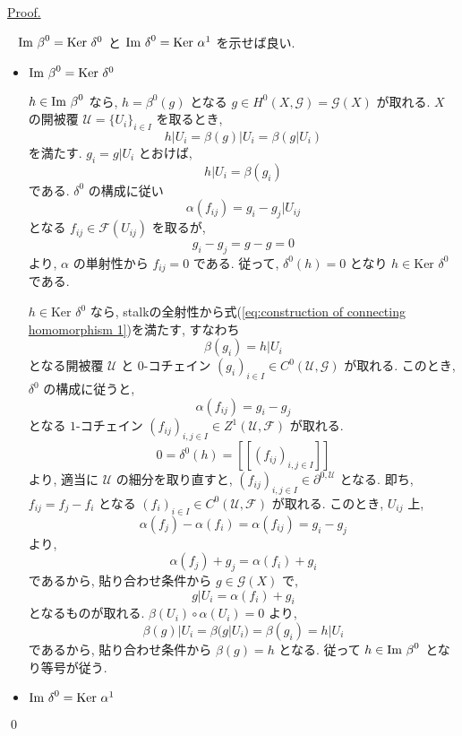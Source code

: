 \documentclass[a4paper,10pt,dvipdfmx]{jsreport}
\renewenvironment{proof}{\begin{flushleft} \underline{Proof.} \end{flushleft}\vspace{-1zh}\ }{\qed\\}
\renewcommand{\Im}[1]{{{\rm Im\ }{#1}}}
\renewcommand{\ker}{\textrm{Ker }}
\theoremstyle{definition}
\begin{document}
\begin{proof}
    \(\Im \beta^0 = \ker \delta^0\) と \(\Im \delta^0 = \ker \alpha^1\) を示せば良い.
    \begin{itemize}
        \item \(\Im \beta^0 = \ker \delta^0\)
        
        \(h\in \Im \beta^0\) なら, \(h = \beta^0 (g)\) となる \(g\in H^0(X,\mathscr{G}) = \mathscr{G}(X)\) が取れる. \(X\) の開被覆 \(\mathcal{U} = \{U_i\}_{i\in I}\) を取るとき,
        \[
            h|U_i = \beta(g)|U_i = \beta(g|U_i)
        \]
        を満たす. \(g_i = g|U_i\) とおけば,
        \[
            h|U_i = \beta(g_i)
        \]
        である. \(\delta^0\) の構成に従い
        \[
            \alpha(f_{ij}) = g_i - g_j|U_{ij}
        \]
        となる \(f_{ij} \in \mathscr{F}(U_{ij})\) を取るが,
        \[
            g_i - g_j = g - g = 0
        \]
        より, \(\alpha\) の単射性から \(f_{ij} = 0\) である. 従って, \(\delta^0(h) = 0\) となり \(h \in \ker \delta^0\) である.

        \(h \in \ker \delta^0\) なら, stalkの全射性から式(\ref{eq:construction of connecting homomorphism 1})を満たす, すなわち
        \[
            \beta(g_i) = h|U_i
        \]
        となる開被覆 \(\mathcal{U}\) と \(0\)-コチェイン \((g_i)_{i\in I} \in C^0(\mathcal{U},\mathscr{G})\) が取れる. このとき, \(\delta^0\) の構成に従うと,
        \[
            \alpha(f_{ij}) = g_i - g_j
        \]
        となる \(1\)-コチェイン \((f_{ij})_{i,j\in I} \in Z^1(\mathcal{U},\mathscr{F})\) が取れる.
        \[
            0 = \delta^0(h) = [[(f_{ij})_{i,j \in I}]]
        \]
        より, 適当に \(\mathcal{U}\) の細分を取り直すと, \((f_{ij})_{i,j \in I} \in \partial^{0,\mathcal{U}}\) となる. 即ち, \(f_{ij} = f_j - f_i\) となる \((f_i)_{i\in I} \in C^0(\mathcal{U},\mathscr{F})\) が取れる. このとき, \(U_{ij}\) 上,
        \[
            \alpha(f_j) - \alpha(f_i) = \alpha(f_{ij}) = g_i - g_j
        \]
        より,
        \[
            \alpha(f_j) + g_j = \alpha(f_i) + g_i
        \]
        であるから, 貼り合わせ条件から \(g\in \mathscr{G}(X)\) で,
        \[
            g|U_i = \alpha(f_i) + g_i
        \]
        となるものが取れる. \(\beta(U_i) \circ \alpha(U_i) = 0\) より,
        \[
            \beta(g)|U_i = \beta(g|U_i) = \beta(g_i) = h|U_i
        \]
        であるから, 貼り合わせ条件から \(\beta(g) = h\) となる. 従って \(h\in \Im \beta^0\) となり等号が従う.
        \item \(\Im \delta^0 = \ker \alpha^1\)


\end{itemize}
\end{proof}
\end{document}
